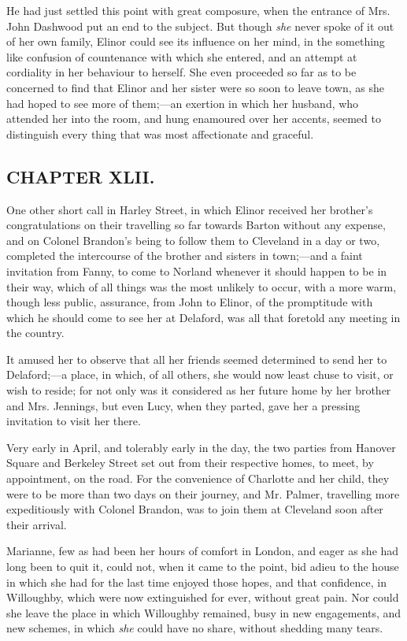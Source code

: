 He had just settled this point with great composure, when the entrance of Mrs. John Dashwood put an end to the subject. But though {\em she} never spoke of it out of her own family, Elinor could see its influence on her mind, in the something like confusion of countenance with which she entered, and an attempt at cordiality in her behaviour to herself. She even proceeded so far as to be concerned to find that Elinor and her sister were so soon to leave town, as she had hoped to see more of them;---an exertion in which her husband, who attended her into the room, and hung enamoured over her accents, seemed to distinguish every thing that was most affectionate and graceful.

\subsection[chapter-xlii.]{\useURL[url42][][][]\from[url42]CHAPTER XLII.}

One other short call in Harley Street, in which Elinor received her brother's congratulations on their travelling so far towards Barton without any expense, and on Colonel Brandon's being to follow them to Cleveland in a day or two, completed the intercourse of the brother and sisters in town;---and a faint invitation from Fanny, to come to Norland whenever it should happen to be in their way, which of all things was the most unlikely to occur, with a more warm, though less public, assurance, from John to Elinor, of the promptitude with which he should come to see her at Delaford, was all that foretold any meeting in the country.

It amused her to observe that all her friends seemed determined to send her to Delaford;---a place, in which, of all others, she would now least chuse to visit, or wish to reside; for not only was it considered as her future home by her brother and Mrs. Jennings, but even Lucy, when they parted, gave her a pressing invitation to visit her there.

Very early in April, and tolerably early in the day, the two parties from Hanover Square and Berkeley Street set out from their respective homes, to meet, by appointment, on the road. For the convenience of Charlotte and her child, they were to be more than two days on their journey, and Mr. Palmer, travelling more expeditiously with Colonel Brandon, was to join them at Cleveland soon after their arrival.

Marianne, few as had been her hours of comfort in London, and eager as she had long been to quit it, could not, when it came to the point, bid adieu to the house in which she had for the last time enjoyed those hopes, and that confidence, in Willoughby, which were now extinguished for ever, without great pain. Nor could she leave the place in which Willoughby remained, busy in new engagements, and new schemes, in which {\em she} could have no share, without shedding many tears.

